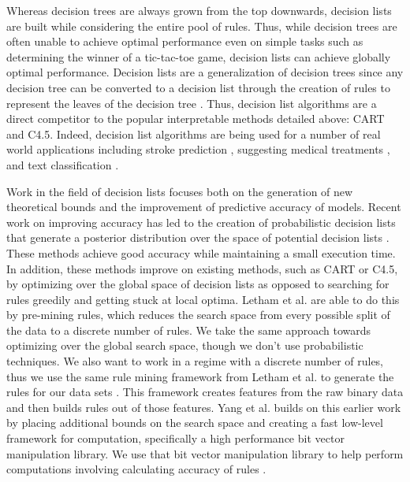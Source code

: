 Whereas decision trees are always grown from the top downwards, decision lists are built while considering the entire pool of rules.
Thus, while decision trees are often unable to achieve optimal performance even on simple tasks such as determining the winner of a tic-tac-toe game, decision lists can achieve globally optimal performance.
Decision lists are a generalization of decision trees since any decision tree can be converted to a decision list through the creation of rules to represent the leaves of the decision tree \cite{Rivest87}.
Thus, decision list algorithms are a direct competitor to the popular interpretable methods detailed above: CART and C4.5.
Indeed, decision list algorithms are being used for a number of real world applications including stroke prediction \cite{LethamRuMcMa15}, suggesting medical treatments \cite{ZhangLaTsDa2015}, and text classification \cite{LiYa02}.

Work in the field of decision lists focuses both on the generation of new theoretical bounds and the improvement of predictive accuracy of models.
Recent work on improving accuracy has led to the creation of probabilistic decision lists that generate a posterior distribution over the space of potential decision lists \cite{LethamRuMcMa15,YangRuSe16}.
These methods achieve good accuracy while maintaining a small execution time.
In addition, these methods improve on existing methods, such as CART or C4.5, by optimizing over the global space of decision lists as opposed to searching for rules greedily and getting stuck at local optima.
Letham et al. are able to do this by pre-mining rules, which reduces the search space from every possible split of the data to a discrete number of rules.
We take the same approach towards optimizing over the global search space, though we don’t use probabilistic techniques.
We also want to work in a regime with a discrete number of rules, thus we use the same rule mining framework from Letham et al. to generate the rules for our data sets \cite{LethamRuMcMa15}.
This framework creates features from the raw binary data and then builds rules out of those features.
Yang et al. builds on this earlier work by placing additional bounds on the search space and creating a fast low-level framework for computation, specifically a high performance bit vector manipulation library.
We use that bit vector manipulation library to help perform computations involving calculating accuracy of rules \cite{YangRuSe16}.

